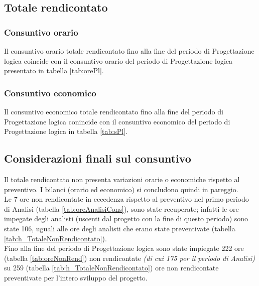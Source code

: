 	\newpage
	\subsection{Totale rendicontato}
		\subsubsection{Consuntivo orario}
		Il consuntivo orario totale rendicontato fino alla fine del periodo di Progettazione logica coincide con il consuntivo orario del periodo di Progettazione logica presentato in tabella \ref{tab:orePl}.
		\subsubsection{Consuntivo economico}
		Il consuntivo economico totale rendicontato fino alla fine del periodo di Progettazione logica conincide con il consuntivo economico del periodo di Progettazione logica in tabella \ref{tab:sPl}.
	\subsection{Considerazioni finali sul consuntivo}
	\label{consid_cons_pl}
	Il totale rendicontato non presenta variazioni orarie o economiche rispetto al preventivo. I bilanci (orario ed economico) si concludono quindi in pareggio.\\
	Le 7 ore non rendicontate in eccedenza rispetto al preventivo nel primo periodo di Analisi (tabella \ref{tab:oreAnalisiCons}), sono state recuperate; infatti le ore impegate degli analisti (uscenti dal progetto con la fine di questo periodo) sono state 106, uguali alle ore degli analisti che erano state preventivate (tabella \ref{tab:h_TotaleNonRendicontato}).
	\\ Fino alla fine del periodo di Progettazione logica sono state impiegate 222 ore (tabella \ref{tab:oreNonRend}) non rendicontate \textit{(di cui 175 per il periodo di Analisi)} su 259 (tabella \ref{tab:h_TotaleNonRendicontato}) ore non rendicontate preventivate per l'intero sviluppo del progetto.
	